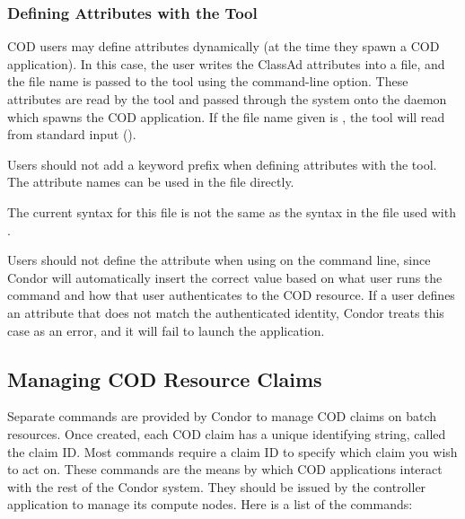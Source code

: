 \subsubsection{\label{sec:cod-command-line-attrs}
Defining Attributes with the  Tool} 

COD users may define attributes dynamically (at the time they spawn a
COD application).
In this case, the user writes the ClassAd attributes into a file, and the
file name is passed to the  tool using the
 command-line option.
These attributes are read by the  tool and passed through
the system onto the  daemon which spawns the COD application. 
If the file name given is \File{-}, the  tool will read
from standard input ().


Users should not add a keyword prefix 
when defining attributes with the  tool.
The attribute names can be used in the file directly.

\Warn The current syntax for this file is not the same as the syntax
in the file used with .

\Note Users should not define the  attribute
when using  on the command line, since Condor
will automatically insert the correct value based on what user runs the
 command and how that user authenticates to the
COD resource.
If a user defines an attribute that does not match the authenticated
identity, Condor treats this case as an error, and it will fail to launch the
application.


\subsection{\label{sec:cod-managing-claims}
Managing COD Resource Claims}

Separate commands are provided by Condor to manage COD
claims on batch resources.
Once created, each COD claim has a unique identifying string, called the
claim ID.
Most commands require a claim ID to specify which claim you wish to
act on. 
These commands are the means by which COD applications interact with
the rest of the Condor system.
They should be issued by the controller application to manage its
compute nodes.
Here is a list of the commands:

